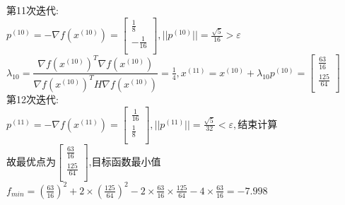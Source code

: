 \begin{solution}
    第11次迭代:\\
    $p^{(10)}=-\nabla f(x^{(10)})=\begin{bmatrix} \frac{1}{8}\\-\frac{1}{16}\\\end{bmatrix},||p^{(10)}||=\frac{\sqrt{5}}{16}>\varepsilon$\\
    $\lambda_{10}=\dfrac{\nabla f(x^{(10)})^T\nabla f(x^{(10)})}{\nabla f(x^{(10)})^TH\nabla f(x^{(10)})}=\frac{1}{4},x^{(11)}=x^{(10)}+\lambda_{10}p^{(10)}=\begin{bmatrix} \frac{63}{16}\\\frac{125}{64}\\\end{bmatrix}$\\
    第12次迭代:\\
    $p^{(11)}=-\nabla f(x^{(11)})=\begin{bmatrix} \frac{1}{16}\\\frac{1}{8}\\\end{bmatrix},||p^{(11)}||=\frac{\sqrt{5}}{32}<\varepsilon,\text{结束计算}$\\
    故最优点为$\begin{bmatrix} \frac{63}{16}\\\frac{125}{64}\\\end{bmatrix}$,目标函数最小值$f_{min}=(\frac{63}{16})^2+2\times(\frac{125}{64})^2-2\times\frac{63}{16}\times\frac{125}{64}-4\times\frac{63}{16}=-7.998$
\end{solution}

